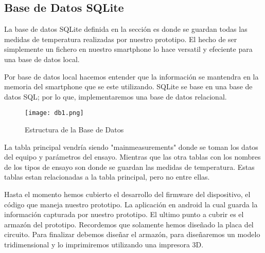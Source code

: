 \subsection{Base de Datos SQLite}

\par \noindent
La base de datos SQLite definida en la sección es donde se guardan todas las medidas de temperatura realizadas por nuestro prototipo. El hecho de ser simplemente un fichero en nuestro smartphone lo hace versatil y efeciente para una base de datos local. 


\par \noindent
Por base de datos local hacemos entender que la información se mantendra en la memoria del smartphone que se este utilizando. SQLite se base en una base de datos SQL; por lo que, implementaremos una base de datos relacional. 

\begin{figure}[H]
	\centering
	\texttt{[image: db1.png]}
	\caption{Estructura de la Base de Datos}
\end{figure}

\clearpage

\par \noindent
La tabla principal vendría siendo "mainmeasurements" donde se toman los datos del equipo y parámetros del ensayo. Mientras que las otra tablas con los nombres de los tipos de ensayo son donde se guardan las medidas de temperatura. Estas tablas estan relacionadas a la tabla principal, pero no entre ellas.


\par \noindent
Hasta el momento hemos cubierto el desarrollo del firmware del dispositivo, el código que maneja nuestro prototipo. La aplicación en android la cual guarda la información capturada por nuestro prototipo. El ultimo punto a cubrir es el armazón del prototipo. Recordemos que solamente hemos diseñado la placa del circuito. Para finalizar debemos diseñar el armazón, para diseñaremos un modelo tridimensional y lo imprimiremos utilizando una impresora 3D.

